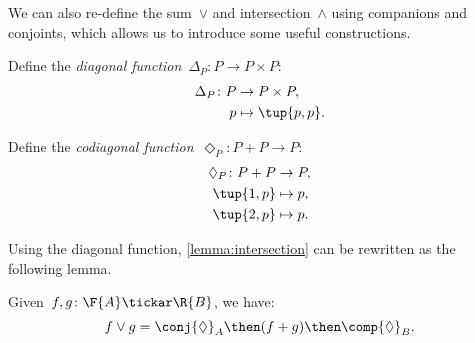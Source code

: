 We can also re-define the sum~$\vee$ and intersection~$\wedge$ using companions and conjoints, which allows us to introduce some useful constructions.

\begin{definition}
Define the \emph{diagonal function}~$\Delta_P\colon P \to P \times P$:
\begin{equation}
\begin{aligned}
    \Delta_P \colon P & \to P \times P, \\
             p & \mapsto \tup{p, p}.
\end{aligned}
\end{equation}
\end{definition}

\begin{definition}
Define the \emph{codiagonal function}~$\Diamond_P\colon P+P \to P $:
\begin{equation}
\begin{aligned}
    \Diamond_P \colon P + P & \to P,  \\
            \tup{1,p} & \mapsto p, \\
            \tup{2,p} & \mapsto p.
\end{aligned}
\end{equation}
\end{definition}

\noindent Using the diagonal function, \cref{lemma:intersection} can be rewritten as the following lemma.

\begin{lemma}
    Given~$f, g\colon \F{A} \tickar \R{B}$, we have:
    \begin{equation}
        f \vee g =  \conj{\Diamond}_A \then (f + g)\then \comp{\Diamond}_B.
    \end{equation}
\end{lemma}

